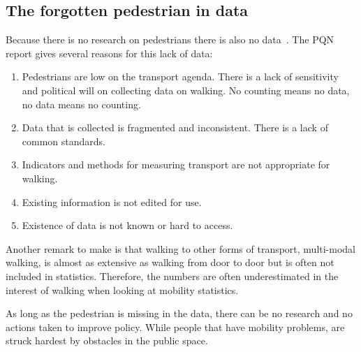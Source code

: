 \subsection{The forgotten pedestrian in data}
Because there is no research on pedestrians there is also no data~\cite{Sauter2010}. The PQN report gives several reasons for this lack of data:
\begin{enumerate}
\item Pedestrians are low on the transport agenda. There is a lack of sensitivity and political will on collecting data on walking. No counting means no data, no data means no counting.
\item Data that is collected is fragmented and inconsistent. There is a lack of common standards.
\item Indicators and methods for measuring transport are not appropriate for walking.
\item Existing information is not edited for use.
\item Existence of data is not known or hard to access.
\end{enumerate}

Another remark to make is that walking to other forms of transport, multi-modal walking, is almost as extensive as walking from door to door but is often not included in statistics. Therefore, the numbers are often underestimated in the interest of walking when looking at mobility statistics.~\cite{VeiligheidNL2012, Sauter2010} 

As long as the pedestrian is missing in the data, there can be no research and no actions taken to improve policy. While people that have mobility problems, are struck hardest by obstacles in the public space.~\cite{VandeRidder2008} 


